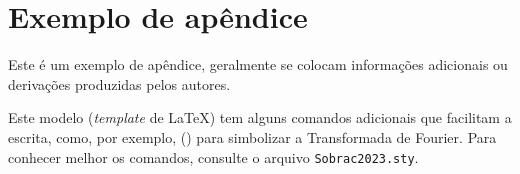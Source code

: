 \documentclass[12pt, a4paper, twoside, onecolumn]{article}
\begin{document}
\section{Exemplo de apêndice}

Este é um exemplo de apêndice, geralmente se colocam informações adicionais ou derivações produzidas pelos autores.

Este modelo (\textit{template} de \LaTeX) tem alguns comandos adicionais que facilitam a escrita, como, por exemplo, \lcode{\\F} (\F\xspace) para simbolizar a Transformada de Fourier. Para conhecer melhor os comandos, consulte o arquivo \texttt{Sobrac2023.sty}.

%
%

\end{document}
